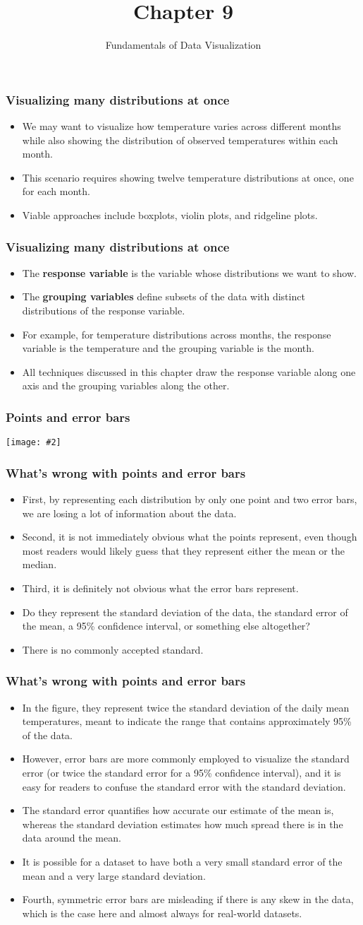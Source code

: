 \documentclass{beamer}
\author{Fundamentals of Data Visualization}
\title{Chapter 9}
\newcommand{\bi}{\begin{itemize}}
\newcommand{\li}{\item}
\newcommand{\ei}{\end{itemize}}
\newcommand{\fig}[2]{\centerline{\texttt{[image: \#2]}}}
\newcommand{\bfr}[1]{\begin{frame}[fragile]\frametitle{{ #1 }}}
\begin{document}
\begin{frame}
\maketitle
\end{frame}

\bfr{Visualizing many distributions at once}
\bi
\li We may want to visualize how temperature varies across different months while also showing the distribution of observed temperatures within each month.
\li This scenario requires showing twelve temperature distributions at once, one for each month.
\li Viable approaches include boxplots, violin plots, and ridgeline plots.

\ei
\end{frame}
\bfr{Visualizing many distributions at once}
\bi
\li The {\bf response variable} is the  variable whose distributions we want to show. 
\li  The {\bf grouping variables} define subsets of the data with distinct distributions of the response variable.
\li For example, for temperature distributions across months, the response variable is the temperature and the grouping variable is the month. 
\li All techniques discussed in this chapter draw the response variable along one axis and the grouping variables along the other.
\ei
\end{frame}

\bfr{Points and error bars}
\fig{1}{lincoln-temp-points-errorbars-1.png}
\end{frame}

\bfr{What's wrong with points and error bars}
\bi
\li First, by representing each distribution by only one point and two error bars, we are losing a lot of information about the data. 
\li Second, it is not immediately obvious what the points represent, even though most readers would likely guess that they represent either the mean or the median.
\li Third, it is definitely not obvious what the error bars represent.
\li Do they represent the standard deviation of the data, the standard error of the mean, a 95\% confidence interval, or something else altogether? 
\li There is no commonly accepted standard. 
\ei
\end{frame}


\bfr{What's wrong with points and error bars}
\bi
\li In the figure, they represent  twice the standard deviation of the daily mean temperatures, meant to indicate the range that contains approximately 95\% of the data.
\li However, error bars are more commonly employed to visualize the standard error (or twice the standard error for a 95\% confidence interval), and it is easy for readers to confuse the standard error with the standard deviation. 
\li The standard error quantifies how accurate our estimate of the mean is, whereas the standard deviation estimates how much spread there is in the data around the mean.
\li It is possible for a dataset to have both a very small standard error of the mean and a very large standard deviation.
\li Fourth, symmetric error bars are misleading if there is any skew in the data, which is the case here and almost always for real-world datasets.
\ei
\end{frame}
\end{document}
